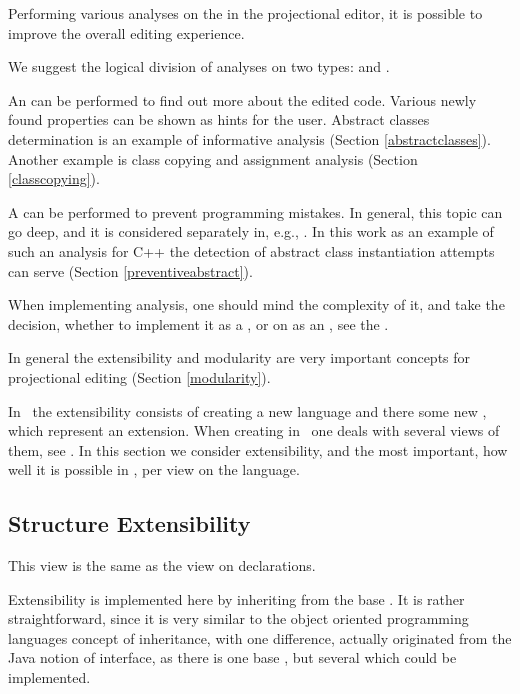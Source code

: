Performing various analyses on the  in the projectional editor, it is possible to improve the overall 
editing experience.

We suggest the logical division of analyses on two types:  and .

An  can be performed to find out more about the edited code. Various newly found properties
can be shown as hints for the user. Abstract classes determination is an example of informative analysis (Section \ref{abstractclasses}). Another example
is class copying and assignment analysis (Section \ref{classcopying}).

A  can be performed to prevent programming mistakes. In general, this topic can go deep, and it is considered separately in, e.g.,
\cite{2012_ratiu_modular_dsls_and_analyses}. In this work as an example of such an analysis for C++ the detection of abstract class instantiation
attempts can serve (Section \ref{preventiveabstract}).

When implementing analysis, one should mind the complexity of it, and take the decision, whether to implement it as a , or
on as an , see the .



In general the extensibility and modularity are very important concepts for projectional editing (Section \ref{modularity}).

In \jbmps\ the extensibility consists of creating a new language and there some new , which represent an extension.
When creating  in \jbmps\ one deals with several views of them, see . In this section we consider extensibility, and 
the most important, how well it is possible in \jbmps, per view on the language.

\subsection{Structure Extensibility}

This view is the same as the view on  declarations.

Extensibility is implemented here by inheriting from the base . It is rather straightforward, 
since it is very similar to the object oriented programming languages concept of inheritance, with one difference, 
actually originated from the Java notion of interface, as there is one base , but several 
which could be implemented.

